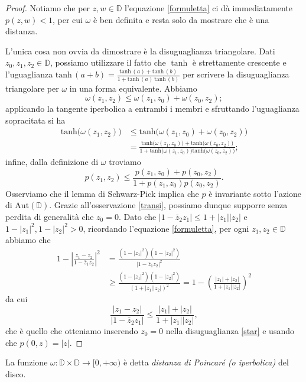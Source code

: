 \begin{proof}
  Notiamo che per $z,w \in \mathbb{D}$ l'equazione \eqref{formuletta} ci dà immediatamente $p(z,w)<1$, per cui $\omega$ è ben definita e resta solo da mostrare che è una distanza.

  L'unica cosa non ovvia da dimostrare è la disuguaglianza triangolare. Dati $z_0, z_1, z_2 \in \mathbb{D}$, possiamo utilizzare il fatto che $\tanh$ è strettamente crescente e l'uguaglianza $\text{tanh}\,(a+b)=\frac{\text{tanh}\,(a)+\text{tanh}\,(b)}{1+\text{tanh}\,(a)\,\text{tanh}\,(b)}$ per scrivere la disuguaglianza triangolare per $\omega$ in una forma equivalente. Abbiamo
  $$\omega(z_1, z_2) \le \omega(z_1, z_0)+\omega(z_0,z_2);$$
  applicando la tangente iperbolica a entrambi i membri e sfruttando l'uguaglianza sopracitata si ha
  \begin{align*}
    \text{tanh}\bigl(\omega(z_1,z_2)\bigr) & \le \text{tanh}\bigl(\omega(z_1, z_0)+\omega(z_0,z_2)\bigr) \\
    &=\frac{\text{tanh}\bigl(\omega(z_1, z_0)\bigr)+\text{tanh}\bigl(\omega(z_0,z_2)\bigr)}{1+\text{tanh}\bigl(\omega(z_1, z_0)\bigr)\text{tanh}\bigl(\omega(z_0,z_2)\bigr)};
  \end{align*}
  infine, dalla definizione di $\omega$ troviamo
  \begin{equation}
    p(z_1,z_2) \le \frac{p(z_1,z_0)+p(z_0,z_2)}{1+p(z_1,z_0)p(z_0,z_2)}. \label{star}
  \end{equation}
  Osserviamo che il lemma di Schwarz-Pick implica che $p$ è invariante sotto l'azione di $\text{Aut}(\mathbb{D})$. Grazie all'osservazione \ref{transi}, possiamo dunque supporre senza perdita di generalità che $z_0=0$. Dato che $|1-\bar{z}_2z_1| \le 1+|z_1||z_2|$ e $1-|z_1|^2, 1-|z_2|^2>0$, ricordando l'equazione \eqref{formuletta}, per ogni $z_1, z_2 \in \mathbb{D}$ abbiamo che
  \begin{align*}
    1-\left|\frac{z_1-z_2}{1-\bar{z}_1z_2}\right|^2 & =\frac{(1-|z_1|^2)(1-|z_2|^2)}{|1-\bar{z}_1z_2|^2} \\
    & \ge \frac{(1-|z_1|^2)(1-|z_2|^2)}{(1+|z_1||z_2|)^2}=1-\left(\frac{|z_1|+|z_2|}{1+|z_1||z_2|}\right)^2
  \end{align*}
  da cui
  $$\frac{|z_1-z_2|}{|1-\bar{z}_2z_1|} \le \frac{|z_1|+|z_2|}{1+|z_1||z_2|},$$
  che è quello che otteniamo inserendo $z_0=0$ nella disuguaglianza \eqref{star} e usando che $p(0,z)=|z|$.
\end{proof}

\begin{defn}
  La funzione $\omega:\mathbb{D}\times \mathbb{D} \longrightarrow [0,+\infty)$ è detta \textit{distanza di Poincaré (o iperbolica)} del disco.
\end{defn}

